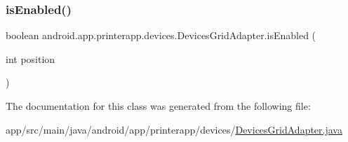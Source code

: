 \subsubsection{\texorpdfstring{is\+Enabled()}{isEnabled()}}
{\footnotesize\ttfamily boolean android.\+app.\+printerapp.\+devices.\+Devices\+Grid\+Adapter.\+is\+Enabled (\begin{DoxyParamCaption}\item[{int}]{position }\end{DoxyParamCaption})}



The documentation for this class was generated from the following file\+:\begin{DoxyCompactItemize}
\item 
app/src/main/java/android/app/printerapp/devices/\hyperlink{_devices_grid_adapter_8java}{Devices\+Grid\+Adapter.\+java}\end{DoxyCompactItemize}
